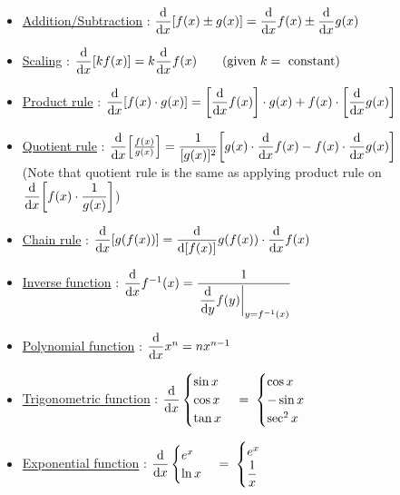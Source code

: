 \documentclass[class=article, crop=false, 12pt]{standalone}
\begin{document}
\begin{itemize}
    \item \ul{Addition/Subtraction} : $\dvv{x}[f(x)\pm g(x)] = \dvv{x}f(x) \pm \dvv{x}g(x)$
    
    \item \ul{Scaling} : $\dvv{x}[kf(x)] = k\dvv{x}f(x)\qquad (\text{given }k = \text{ constant})$

    \item \ul{Product rule} : $\dvv{x}[f(x)\cdot g(x)] = \qty[\dvv{x}f(x)]\cdot g(x) + f(x)\cdot \qty[\dvv{x} g(x)]$
    
    \item \ul{Quotient rule} : $\dvv{x}\qty[\frac{f(x)}{g(x)}] = \dinv{[g(x)]^2}\qty[g(x)\cdot \dvv{x}f(x) - f(x)\cdot \dvv{x}g(x)]$ \\[1em]
        (Note that quotient rule is the same as applying product rule on $\displaystyle \dvv{x}\qty[f(x)\cdot \inv{g(x)}]$)
    
    \item \ul{Chain rule} : $\dvv{x}[g(f(x))] = \dvv{[f(x)]}g(f(x)) \cdot \dvv{x}f(x)$
    
    \item \ul{Inverse function} : $\dvv{x} f^{-1}(x) = \dinv{\eval{\dvv{y}f(y)}_{y=f^{-1}(x)}}$

    \item \ul{Polynomial function} : $\dvv{x} x^n = nx^{n-1}$
    
    \item \ul{Trigonometric function} : $\dvv{x} 
        \begin{cases} \sin{x}\\ \cos{x}\\ \tan{x} \end{cases}
        =\;
        \begin{cases} \cos{x}\\ -\sin{x}\\ \sec^2{x} \end{cases}
        $

    \item \ul{Exponential function} : $\dvv{x} 
        \begin{cases} e^{x}\\ \ln{x} \end{cases}
        =\;
        \begin{cases} e^{x}\\ \dinv{x} \end{cases}
        $
\end{itemize}
\end{document}
